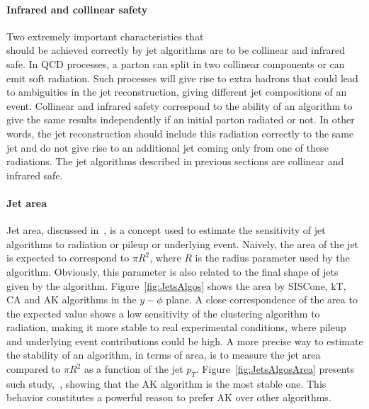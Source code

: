 \paragraph{Infrared and collinear safety}

\hfill Two extremely important characteristics that \\should be achieved correctly by jet algorithms are to be collinear and infrared safe. In QCD processes, a parton can split in two collinear components or can emit soft radiation. Such processes will give rise to extra hadrons that could lead to ambiguities in the jet reconstruction, giving different jet compositions of an event. Collinear and infrared safety correspond to the ability of an algorithm to give the same results independently if an initial parton radiated or not. In other words, the jet reconstruction should include this radiation correctly to the same jet and do not give rise to an additional jet coming only from one of these radiations.  The jet algorithms described in previous sections are collinear and infrared safe.

\paragraph{Jet area}

Jet area, discussed in~\cite{Cacciari:2008gn}, is a concept used to estimate the sensitivity of jet algorithms to radiation or pileup or underlying event. Naively, the area of the jet is expected to correspond to $\pi R^{2}$, where $R$ is the radius parameter used by the algorithm. Obviously, this parameter is also related to the final shape of jets given by the algorithm. Figure~\ref{fig:JetsAlgos} shows the area by SISCone, kT, CA and AK algorithms in the $y-\phi$ plane. A close correspondence of the area to the expected value shows a low sensitivity of the clustering algorithm to radiation, making it more stable to real experimental conditions, where pileup and underlying event contributions could be high. A more precise way to estimate the stability of an algorithm, in terms of area, is to measure the jet area compared to $\pi R^{2}$ as a function of the jet $p_{T}$. Figure~\ref{fig:JetsAlgosArea} presents such study,~\cite{Cacciari:2008gp}, showing that the AK algorithm is the most stable one. This behavior constitutes a powerful reason to prefer AK over other algorithms. 

